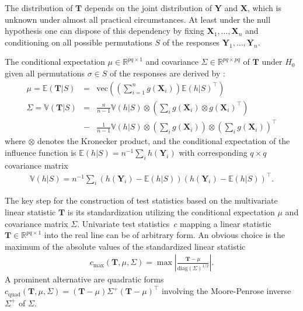 \documentclass{article}
\newcommand{\R}{\mathbb{R} }
\newcommand{\V}{\mathbb{V}} %
\newcommand{\E}{\mathbb{E}} %
\newcommand{\X}{\mathbf{X}}
\newcommand{\Y}{\mathbf{Y}}
\newcommand{\T}{\mathbf{T}}
\renewcommand{\vec}{\text{vec}}
\begin{document}
The distribution of $\T$  depends on the joint distribution of $\Y$ and $\X$, 
which is unknown under almost all practical circumstances. 
At least under the null hypothesis one can dispose of this 
dependency by fixing $\X_1, \dots, \X_n$ and conditioning on all possible 
permutations $S$ of the responses $\Y_1, \dots, \Y_n$. 

The conditional expectation $\mu \in \R^{pq \times 1}$ and covariance
$\Sigma \in \R^{pq \times pq}$ of $\T$ under $H_0$ given
all permutations $\sigma \in S$ of the responses are derived by
\cite{StrasserWeber1999}:
\begin{eqnarray*}
\mu = \E(\T | S) & = & \vec \left( \left( \sum_{i = 1}^n g(\X_i) \right)
\E(h | S)^\top \right) \\
\Sigma = \V(\T | S) & = &
    \frac{n}{n - 1}  \V(h | S) \otimes
        \left(\sum_i g(\X_i) \otimes  g(\X_i)^\top \right)
\\
& - & \frac{1}{n - 1}  \V(h | S)  \otimes \left(
        \sum_i g(\X_i) \right) \otimes \left( \sum_i g(\X_i)\right)^\top
\nonumber
\end{eqnarray*}
where $\otimes$ denotes the Kronecker product, and the conditional
expectation of the influence function is $\E(h | S) = n^{-1} \sum_i
h(\Y_i)$ with corresponding $q \times q$ covariance matrix
\begin{eqnarray*}
\V(h | S) = n^{-1} \sum_i \left(h(\Y_i) - \E(h | S) \right) \left(h(\Y_i) - \E(h | S)\right)^\top.
\end{eqnarray*}

The key step for the construction of test statistics based on the multivariate
linear statistic $\T$ is its standardization utilizing the 
conditional expectation $\mu$ and covariance matrix $\Sigma$. 
Univariate test statistics~$c$ mapping a linear
statistic $\T \in \R^{pq \times 1}$ 
into the real line can be of arbitrary form.  An obvious choice is
the maximum of the absolute values of the standardized linear statistic
\begin{eqnarray*}
c_\text{max}(\T, \mu, \Sigma)  = \max \left| \frac{\T -
\mu}{\text{diag}(\Sigma)^{1/2}} \right|.
\end{eqnarray*}
A prominent alternative are quadratic forms 
$c_\text{quad}(\T, \mu, \Sigma)  =
(\T - \mu) \Sigma^+ (\T - \mu)^\top$ involving 
the Moore-Penrose inverse $\Sigma^+$ of $\Sigma$.
\end{document}
